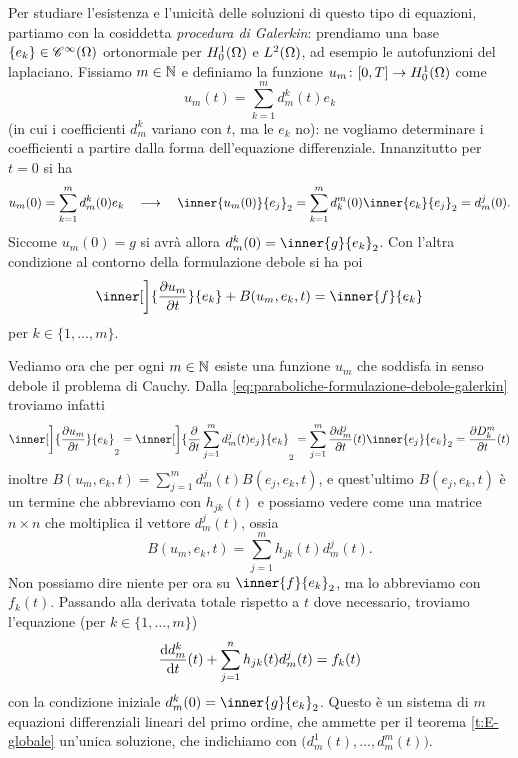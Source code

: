 Per studiare l'esistenza e l'unicità delle soluzioni di questo tipo di equazioni, partiamo con la cosiddetta \emph{procedura di Galerkin}: prendiamo una base $\{e_k\}\in\cont[\infty]{\Omega}$ ortonormale per $\sobHc[1]{\Omega}$ e $\leb[2]{\Omega}$, ad esempio le autofunzioni del laplaciano.
Fissiamo $m\in\N$ e definiamo la funzione $u_m\colon[0,T]\to\sobHc[1]{\Omega}$ come
\begin{equation}
    u_m(t)=\sum_{k=1}^md^k_m(t)e_k
\end{equation}
(in cui i coefficienti $d^k_m$ variano con $t$, ma le $e_k$ no): ne vogliamo determinare i coefficienti a partire dalla forma dell'equazione differenziale.
Innanzitutto per $t=0$ si ha
\begin{equation}
    u_m(0)=\sum_{k=1}^md^k_m(0)e_k
    \qqq
    \inner{u_m(0)}{e_j}_2=\sum_{k=1}^md^m_k(0)\inner{e_k}{e_j}_2=d^j_m(0).
\end{equation}
Siccome $u_m(0)=g$ si avrà allora $d^k_m(0)=\inner{g}{e_k}_2$.
Con l'altra condizione al contorno della formulazione debole si ha poi
\begin{equation}
    \inner[\bigg]{\drp{u_m}{t}}{e_k}+B(u_m,e_k,t)=\inner{f}{e_k}
    \label{eq:paraboliche-formulazione-debole-galerkin}
\end{equation}
per $k\in\{1,\dotsc,m\}$.

Vediamo ora che per ogni $m\in\N$ esiste una funzione $u_m$ che soddisfa in senso debole il problema di Cauchy.
Dalla \eqref{eq:paraboliche-formulazione-debole-galerkin} troviamo infatti
\begin{equation}
    \inner[\bigg]{\drp{u_m}{t}}{e_k}_2=
    \inner[\bigg]{\drp{}{t}\sum_{j=1}^md^j_m(t)e_j}{e_k}_2=
    \sum_{j=1}^m\drp{d^j_m}{t}(t)\inner{e_j}{e_k}_2=
    \drp{D_k^m}{t}(t)
\end{equation}
inoltre $B(u_m,e_k,t)=\sum_{j=1}^md^j_m(t)B(e_j,e_k,t)$, e quest'ultimo $B(e_j,e_k,t)$ è un termine che abbreviamo con $h_{jk}(t)$ e possiamo vedere come una matrice $n\times n$ che moltiplica il vettore $d^j_m(t)$, ossia
\begin{equation}
    B(u_m,e_k,t)=\sum_{j=1}^mh_{jk}(t)d^j_m(t).
\end{equation}
Non possiamo dire niente per ora su $\inner{f}{e_k}_2$, ma lo abbreviamo con $f_k(t)$.
Passando alla derivata totale rispetto a $t$ dove necessario, troviamo l'equazione (per $k\in\{1,\dotsc,m\}$)
\begin{equation}
    \drv{d^k_m}{t}(t)+\sum_{j=1}^nh_{jk}(t)d^j_m(t)=f_k(t)
\end{equation}
con la condizione iniziale $d^k_m(0)=\inner{g}{e_k}_2$.
Questo è un sistema di $m$ equazioni differenziali lineari del primo ordine, che ammette per il teorema \ref{t:E-globale} un'unica soluzione, che indichiamo con $\bigl(d^1_m(t),\dotsc,d^m_m(t)\bigr)$.

